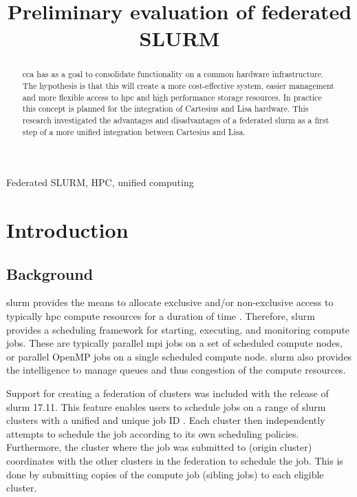 \documentclass[conference]{IEEEtran}
\begin{document}
\title{Preliminary evaluation of federated SLURM}

\author{
}

\maketitle

\begin{abstract}
\gls{cca} has as a goal to consolidate functionality on a common hardware infrastructure. The hypothesis is that this will create a more cost-effective system, easier management and more flexible access to \gls{hpc} and high performance storage resources. In practice this concept is planned for the integration of Cartesius \cite{cartesius-userinfo} and Lisa \cite{lisa-userinfo} hardware. This research investigated the advantages and disadvantages of a federated \gls{slurm} as a first step of a more unified integration between Cartesius and Lisa.
\end{abstract}

\begin{IEEEkeywords}
Federated SLURM, HPC, unified computing
\end{IEEEkeywords}


\section{Introduction}
\subsection{Background}
\label{sec-background}
\gls{slurm} provides the means to allocate exclusive and/or non-exclusive access to typically \gls{hpc} compute resources for a duration of time \cite{wiki-slurm}. Therefore, \gls{slurm} provides a scheduling framework for starting, executing, and monitoring compute jobs. These are typically parallel \gls{mpi} jobs on a set of scheduled compute nodes, or parallel OpenMP jobs on a single scheduled compute node. \gls{slurm} also provides the intelligence to manage queues and thus congestion of the compute resources.

Support for creating a federation of clusters was included with the release of \gls{slurm} 17.11. This feature enables users to schedule jobs on a range of \gls{slurm} clusters with a unified and unique job ID \cite{slurm-federated-guide}. Each cluster then independently attempts to schedule the job according to its own scheduling policies. Furthermore, the cluster where the job was submitted to (origin cluster) coordinates with the other clusters in the federation to schedule the job. This is done by submitting copies of the compute job (sibling jobs) to each eligible cluster.
\end{document}
